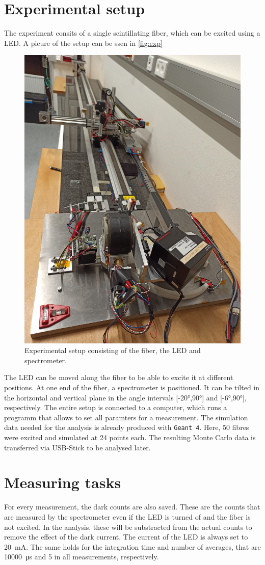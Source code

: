 \section{Experimental setup}
\label{sec:Experimental setup}

The experiment consits of a single scintillating fiber, which can be excited using a LED.
A picure of the setup can be ssen in \autoref{fig:exp}

\begin{figure}[H]
	\centering
	\includegraphics[width=0.5\linewidth]{pics/setup.jpg}
	\caption{Experimental setup consisting of the fiber, the LED and spectrometer.}
	\label{fig:exp}
\end{figure}

The LED can be moved along the fiber to be able to excite it at different positions. At one end of the fiber,
a spectrometer is positioned. It can be tilted in the horizontal and vertical plane in the angle intervals [-20°,90°]
and [-6°,90°], respectively.
The entire setup is connected to a computer, which runs a programm that allows to set all paramters for a measurement.
The simulation data needed for the analysis is already produced with \texttt{Geant 4}. Here, 50 fibres were excited and simulated at 24 points each.
The resulting Monte Carlo data is transferred via USB-Stick to be analysed later.

\section{Measuring tasks}
\label{sec:Measuring tasks}

For every measurement, the dark counts are also saved. These are the counts that are measured by the spectrometer even
if the LED is turned of and the fiber is not excited. In the analysis, these will be substracted from the actual counts
to remove the effect of the dark current.
The current of the LED is always set to \qty{20}{\milli\ampere}. The same holds for the integration time and number of
averages, that are \qty{10000}{\micro\second} and \qty{5}{} in all measurements, respectively.

